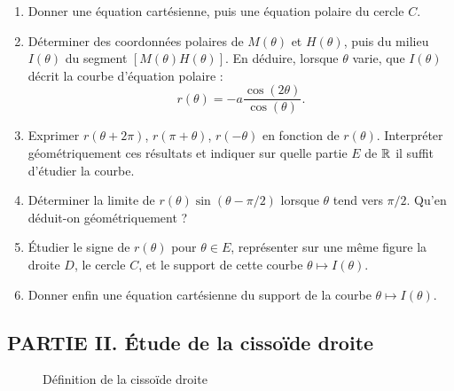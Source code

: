 \begin{enumerate}
\item Donner une {\'e}quation cart{\'e}sienne, puis une {\'e}quation polaire du cercle $C$.
\item D{\'e}terminer des coordonn{\'e}es polaires de $M(\theta)$ et $H(\theta)$, puis du milieu $I(\theta)$ du segment $[M(\theta)H(\theta)]$.\newline
En d{\'e}duire, lorsque $\theta$ varie, que $I(\theta)$ d{\'e}crit la courbe d'{\'e}quation polaire :
$$r(\theta) = -a \dfrac{\cos{(2\theta)}}{\cos{(\theta)}}.$$

\item Exprimer $r(\theta + 2\pi)$, $r(\pi + \theta)$, $r(-\theta)$  en fonction de $r(\theta)$. Interpr{\'e}ter g{\'e}om{\'e}triquement ces r{\'e}sultats et indiquer sur quelle partie $E$ de $\mathbb{R}$ il suffit d'{\'e}tudier la courbe.

\item D{\'e}terminer la limite de $r(\theta) \sin{(\theta - \pi/2)}$ lorsque $\theta$ tend vers $\pi/2$. Qu'en d{\'e}duit-on g{\'e}om{\'e}triquement ?

\item \'Etudier le signe de $r(\theta)$ pour $\theta \in E$, repr{\'e}senter sur une m{\^e}me figure la droite $D$, le cercle $C$, et
le support de cette courbe $\theta \mapsto I(\theta)$.


\item Donner enfin une {\'e}quation cart{\'e}sienne du support de la courbe $\theta \mapsto I(\theta)$.
\end{enumerate}

\subsection*{PARTIE II. \'Etude de la cisso{\"i}de droite}
\begin{figure}[ht]
 \centering
  
\caption{Définition de la cissoïde droite}
\end{figure}

